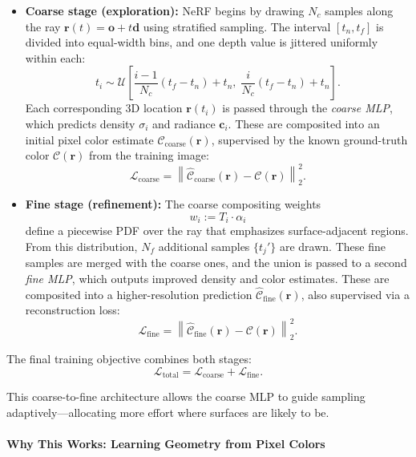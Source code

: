\begin{itemize}
    \item \textbf{Coarse stage (exploration):} NeRF begins by drawing \( N_c \) samples along the ray \( \mathbf{r}(t) = \mathbf{o} + t\mathbf{d} \) using stratified sampling. The interval \( [t_n, t_f] \) is divided into equal-width bins, and one depth value is jittered uniformly within each:
    \[
    t_i \sim \mathcal{U}\left[ \frac{i-1}{N_c}(t_f - t_n) + t_n,\; \frac{i}{N_c}(t_f - t_n) + t_n \right].
    \]
    Each corresponding 3D location \( \mathbf{r}(t_i) \) is passed through the \emph{coarse MLP}, which predicts density \( \sigma_i \) and radiance \( \mathbf{c}_i \). These are composited into an initial pixel color estimate \( \hat{\mathcal{C}}_{\text{coarse}}(\mathbf{r}) \), supervised by the known ground-truth color \( \mathcal{C}(\mathbf{r}) \) from the training image:
    \[
    \mathcal{L}_{\text{coarse}} = \left\| \hat{\mathcal{C}}_{\text{coarse}}(\mathbf{r}) - \mathcal{C}(\mathbf{r}) \right\|_2^2.
    \]
    
    \item \textbf{Fine stage (refinement):} The coarse compositing weights
    \[
    w_i := T_i \cdot \alpha_i
    \]
    define a piecewise PDF over the ray that emphasizes surface-adjacent regions. From this distribution, \( N_f \) additional samples \( \{ t_j' \} \) are drawn. These fine samples are merged with the coarse ones, and the union is passed to a second \emph{fine MLP}, which outputs improved density and color estimates. These are composited into a higher-resolution prediction \( \hat{\mathcal{C}}_{\text{fine}}(\mathbf{r}) \), also supervised via a reconstruction loss:
    \[
    \mathcal{L}_{\text{fine}} = \left\| \hat{\mathcal{C}}_{\text{fine}}(\mathbf{r}) - \mathcal{C}(\mathbf{r}) \right\|_2^2.
    \]
\end{itemize}

\vspace{0.25em}
\noindent
The final training objective combines both stages:
\[
\mathcal{L}_{\text{total}} = \mathcal{L}_{\text{coarse}} + \mathcal{L}_{\text{fine}}.
\]

\noindent
This coarse-to-fine architecture allows the coarse MLP to guide sampling adaptively—allocating more effort where surfaces are likely to be. 

\paragraph{Why This Works: Learning Geometry from Pixel Colors}

